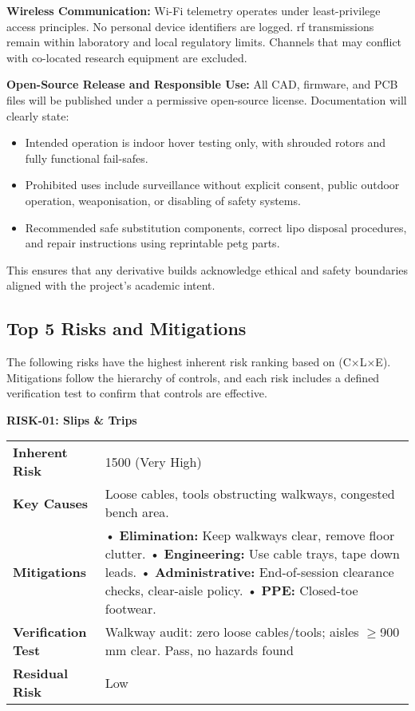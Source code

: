 \vspace{0.5em}
\textbf{Wireless Communication:}  
Wi-Fi telemetry operates under least-privilege access principles. No personal device identifiers are logged. \gls{rf} transmissions remain within laboratory and local regulatory limits. Channels that may conflict with co-located research equipment are excluded.

\vspace{0.5em}
\textbf{Open-Source Release and Responsible Use:}  
All CAD, firmware, and PCB files will be published under a permissive open-source license. Documentation will clearly state:

\begin{itemize}
    \item Intended operation is indoor hover testing only, with shrouded rotors and fully functional fail-safes.
    \item Prohibited uses include surveillance without explicit consent, public outdoor operation, weaponisation, or disabling of safety systems.
    \item Recommended safe substitution components, correct \gls{lipo} disposal procedures, and repair instructions using reprintable \gls{petg} parts.
\end{itemize}

This ensures that any derivative builds acknowledge ethical and safety boundaries aligned with the project's academic intent.

\pagebreak
\subsection{Top 5 Risks and Mitigations}

The following risks have the highest inherent risk ranking based on (C×L×E). Mitigations follow the hierarchy of controls, and each risk includes a defined verification test to confirm that controls are effective.

\textbf{RISK-01: Slips \& Trips}

\begin{tabular}{@{}p{3cm}p{13cm}@{}}
\toprule
\textbf{Inherent Risk} & 1500 (Very High) \\
\textbf{Key Causes} & Loose cables, tools obstructing walkways, congested bench area. \\
\textbf{Mitigations} &
• \textbf{Elimination:} Keep walkways clear, remove floor clutter. \newline
• \textbf{Engineering:} Use cable trays, tape down leads. \newline
• \textbf{Administrative:} End-of-session clearance checks, clear-aisle policy. \newline
• \textbf{PPE:} Closed-toe footwear. \\
\textbf{Verification Test} & Walkway audit: zero loose cables/tools; aisles $\geq$900\,mm clear. Pass, no hazards found \\
\textbf{Residual Risk} & Low \\
\bottomrule
\end{tabular}
\vspace{0.6em}

